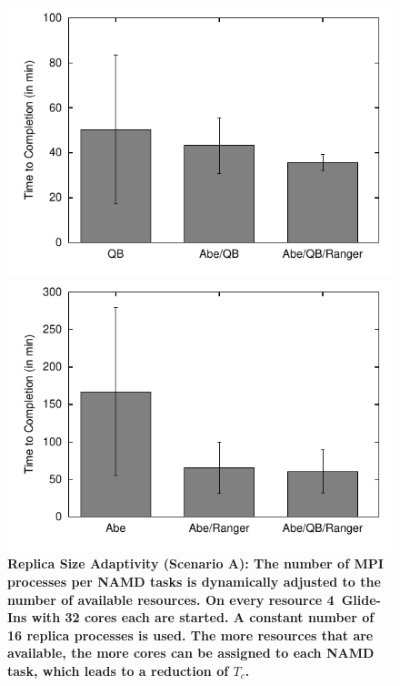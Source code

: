 \documentclass{rspublic}
\begin{document}
{\begin{figure}[h]
  \begin{minipage}[t]{.48\textwidth}
    \begin{center}  
      \includegraphics[width=\textwidth]{performance/perf_distributed_size_replica.pdf}
      \caption{\footnotesize \bf Replica Size Adaptivity (Scenario A):
      The number of MPI processes per NAMD tasks is dynamically adjusted to the number 
      of available resources. On every resource 4~Glide-Ins with 32 cores each are
      started. A constant number of 16 replica processes is used. 
      The more resources that are available, the more cores can be 
      assigned to each NAMD task, which leads to a reduction of $T_{c}$.
      }
      \label{fig:performance_perf_distributed_A}
    \end{center}
  \end{minipage}
  \hfill
  \begin{minipage}[t]{.485\textwidth}
    \begin{center}  
      \includegraphics[width=\textwidth]{performance/perf_distributed_number_replica.pdf}

\end{center}
\end{minipage}
\end{figure}}
\end{document}
